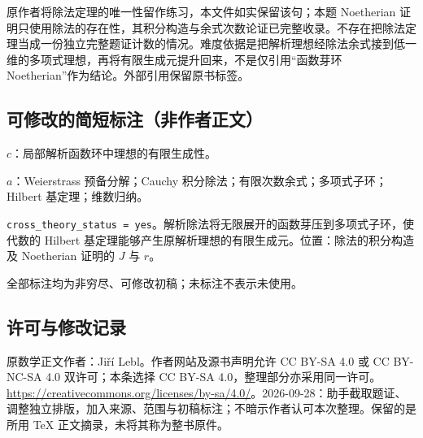 \documentclass[UTF8,11pt]{ctexart}
\theoremstyle{definition}
\begin{document}
原作者将除法定理的唯一性留作练习，本文件如实保留该句；本题 Noetherian 证明只使用除法的存在性，其积分构造与余式次数论证已完整收录。不存在把除法定理当成一份独立完整题证计数的情况。难度依据是把解析理想经除法余式接到低一维的多项式理想，再将有限生成元提升回来，不是仅引用“函数芽环 Noetherian”作为结论。外部引用保留原书标签。
\subsection*{可修改的简短标注（非作者正文）}
$c$：局部解析函数环中理想的有限生成性。

$a$：Weierstrass 预备分解；Cauchy 积分除法；有限次数余式；多项式子环；Hilbert 基定理；维数归纳。

\texttt{cross\_theory\_status = yes}。解析除法将无限展开的函数芽压到多项式子环，使代数的 Hilbert 基定理能够产生原解析理想的有限生成元。位置：除法的积分构造及 Noetherian 证明的 $J$ 与 $r$。

全部标注均为非穷尽、可修改初稿；未标注不表示未使用。
\subsection*{许可与修改记录}
原数学正文作者：Ji\v{r}\'i Lebl。作者网站及源书声明允许 CC BY-SA 4.0 或 CC BY-NC-SA 4.0 双许可；本条选择 CC BY-SA 4.0，整理部分亦采用同一许可。\url{https://creativecommons.org/licenses/by-sa/4.0/}。2026-09-28：助手截取题证、调整独立排版，加入来源、范围与初稿标注；不暗示作者认可本次整理。保留的是所用 TeX 正文摘录，未将其称为整书原件。
\end{document}
